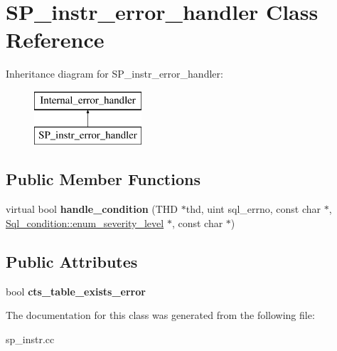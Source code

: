 \hypertarget{classSP__instr__error__handler}{}\section{S\+P\+\_\+instr\+\_\+error\+\_\+handler Class Reference}
\label{classSP__instr__error__handler}
Inheritance diagram for S\+P\+\_\+instr\+\_\+error\+\_\+handler\+:\begin{figure}[H]
\begin{center}
\leavevmode
\includegraphics[height=2.000000cm]{classSP__instr__error__handler}
\end{center}
\end{figure}
\subsection*{Public Member Functions}
\begin{DoxyCompactItemize}
\item 
\mbox{\label{classSP__instr__error__handler_a31905aa67af2b5a1c70e7b2628e350d5}} 
virtual bool {\bfseries handle\+\_\+condition} (T\+HD $\ast$thd, uint sql\+\_\+errno, const char $\ast$, \mbox{\hyperlink{classSql__condition_ab0602581e19cddb609bfe10c44be4e83}{Sql\+\_\+condition\+::enum\+\_\+severity\+\_\+level}} $\ast$, const char $\ast$)
\end{DoxyCompactItemize}
\subsection*{Public Attributes}
\begin{DoxyCompactItemize}
\item 
\mbox{\label{classSP__instr__error__handler_af016f6c2cb5c46e6444523cbb234a166}} 
bool {\bfseries cts\+\_\+table\+\_\+exists\+\_\+error}
\end{DoxyCompactItemize}


The documentation for this class was generated from the following file\+:\begin{DoxyCompactItemize}
\item 
sp\+\_\+instr.\+cc\end{DoxyCompactItemize}
